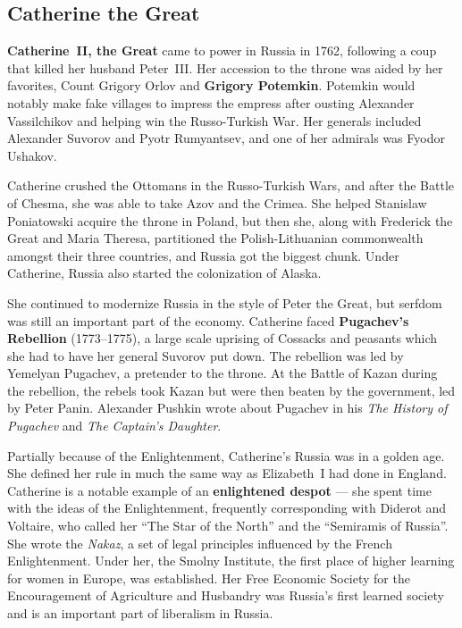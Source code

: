 \subsection*{Catherine the Great}

\textbf{Catherine~II, the Great} came to power in Russia in 1762,
following a coup that killed her husband Peter~III\@.
Her accession to the throne was aided by her favorites,
Count Grigory Orlov and \textbf{Grigory Potemkin}.
Potemkin would notably make fake villages to impress the empress
after ousting Alexander Vassilchikov and helping win the Russo-Turkish War.
Her generals included Alexander Suvorov and Pyotr Rumyantsev, and one of her admirals was Fyodor Ushakov.

Catherine crushed the Ottomans in the Russo-Turkish Wars,
and after the Battle of Chesma, she was able to take Azov and the Crimea.
She helped Stanislaw Poniatowski acquire the throne in Poland,
but then she, along with Frederick the Great and Maria Theresa,
partitioned the Polish-Lithuanian commonwealth amongst their three countries,
and Russia got the biggest chunk.
Under Catherine, Russia also started the colonization of Alaska.

She continued to modernize Russia in the style of Peter the Great,
but serfdom was still an important part of the economy.
Catherine faced \textbf{Pugachev's Rebellion} (1773--1775),
a large scale uprising of Cossacks and peasants which she had to have her general Suvorov put down.
The rebellion was led by Yemelyan Pugachev, a pretender to the throne.
At the Battle of Kazan during the rebellion,
the rebels took Kazan but were then beaten by the government, led by Peter Panin.
Alexander Pushkin wrote about Pugachev in his
\textit{The History of Pugachev} and \textit{The Captain's Daughter}.

Partially because of the Enlightenment, Catherine's Russia was in a golden age.
She defined her rule in much the same way as Elizabeth~I had done in England.
Catherine is a notable example of an \textbf{enlightened despot} ---
she spent time with the ideas of the Enlightenment, frequently corresponding with Diderot and Voltaire,
who called her ``The Star of the North'' and the ``Semiramis of Russia''.
She wrote the \textit{Nakaz}, a set of legal principles influenced by the French Enlightenment.
Under her, the Smolny Institute, the first place of higher learning for women in Europe, was established.
Her Free Economic Society for the Encouragement of Agriculture and Husbandry
was Russia's first learned society and is an important part of liberalism in Russia.

